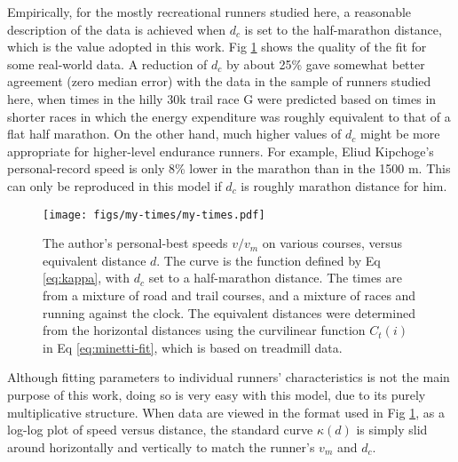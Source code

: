 \documentclass[10pt,letterpaper]{article}
\begin{document}
Empirically, for the mostly recreational runners studied here, a reasonable description of the data is achieved when
$d_c$ is set to the half-marathon distance, which is the value adopted in this work.
Fig \ref{fig:my-times} shows the quality of the fit for some real-world data.
A reduction of $d_c$ by about 25\% gave somewhat better agreement (zero median error) with the data in the sample of runners studied
here,  when times in the hilly 30k trail race G were
predicted based on times in shorter races in which the energy expenditure was roughly equivalent to that of
a flat half marathon.
On the other hand, much higher values of $d_c$ might be more appropriate for higher-level endurance runners.
For example, Eliud Kipchoge's personal-record
speed is only 8\% lower in the marathon than in the 1500 m. This can only be reproduced in this model if $d_c$
is roughly marathon distance for him.

\begin{figure}[h]
\texttt{[image: figs/my-times/my-times.pdf]}
\centering
\caption{The author's personal-best speeds $v/v_m$ on various courses, versus equivalent distance $d$.
The curve is the function defined by Eq \ref{eq:kappa}, with $d_c$ set to a half-marathon distance.
The times are from a mixture of road and trail courses, and a mixture of races and running against the clock.
The equivalent distances were determined from the horizontal distances using the curvilinear
function $C_t(i)$ in Eq \ref{eq:minetti-fit}, which is based on treadmill data.}
\label{fig:my-times}
\end{figure}

Although fitting parameters to individual runners' characteristics is not the main purpose of this work, doing
so is very easy with this model, due to its purely multiplicative structure.
When data are viewed in the format used in Fig \ref{fig:my-times}, as a log-log plot of speed versus distance,
the standard curve $\kappa(d)$ is simply slid around horizontally and vertically to match the runner's $v_m$ and $d_c$.



\end{document}
